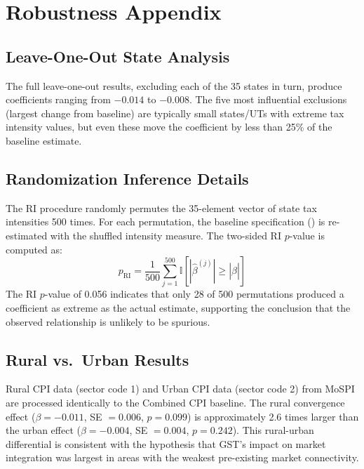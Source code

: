 \documentclass[12pt]{article}
\newcommand{\ind}{\mathbb{I}}
\begin{document}
\section{Robustness Appendix}\label{app:robustness}

\subsection{Leave-One-Out State Analysis}

The full leave-one-out results, excluding each of the 35 states in turn, produce coefficients ranging from $-0.014$ to $-0.008$. The five most influential exclusions (largest change from baseline) are typically small states/UTs with extreme tax intensity values, but even these move the coefficient by less than 25\% of the baseline estimate.

\subsection{Randomization Inference Details}

The RI procedure randomly permutes the 35-element vector of state tax intensities 500 times. For each permutation, the baseline specification () is re-estimated with the shuffled intensity measure. The two-sided RI $p$-value is computed as:
\begin{equation}
p_{\text{RI}} = \frac{1}{500} \sum_{j=1}^{500} \ind[|\hat{\beta}^{(j)}| \geq |\hat{\beta}|]
\end{equation}
The RI $p$-value of 0.056 indicates that only 28 of 500 permutations produced a coefficient as extreme as the actual estimate, supporting the conclusion that the observed relationship is unlikely to be spurious.

\subsection{Rural vs.\ Urban Results}

Rural CPI data (sector code 1) and Urban CPI data (sector code 2) from MoSPI are processed identically to the Combined CPI baseline. The rural convergence effect ($\beta = -0.011$, SE $= 0.006$, $p = 0.099$) is approximately 2.6 times larger than the urban effect ($\beta = -0.004$, SE $= 0.004$, $p = 0.242$). This rural-urban differential is consistent with the hypothesis that GST's impact on market integration was largest in areas with the weakest pre-existing market connectivity.
\end{document}

